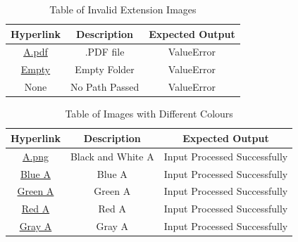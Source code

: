 \documentclass[12pt, titlepage]{article}
\begin{document}
\begin{table}[h!]
  \centering
  \begin{tabular}{|c|c|c|}
    \hline
    \textbf{Hyperlink} & \textbf{Description} & \textbf{Expected Output} \\ \hline
    \href{https://github.com/cer-hunter/OAR-CAS741/tree/main/tests/test-images/A.pdf}{A.pdf} & .PDF file & ValueError \\ \hline
    \href{https://github.com/cer-hunter/OAR-CAS741/tree/main/tests/test-images/Empty}{Empty} & Empty Folder & ValueError \\ \hline
    None & No Path Passed & ValueError \\ \hline
  \end{tabular}
  \caption{Table of Invalid Extension Images}
  \label{table_exterr}
\end{table}

\begin{table}[h!]
  \centering
  \begin{tabular}{|c|c|c|}
    \hline
    \textbf{Hyperlink} & \textbf{Description} & \textbf{Expected Output} \\ \hline
    \href{https://github.com/cer-hunter/OAR-CAS741/tree/main/tests/test-images/A.png}{A.png} & Black and White A & Input Processed Successfully \\ \hline
    \href{https://github.com/cer-hunter/OAR-CAS741/tree/main/tests/test-images/A_Blue.png}{Blue A} & Blue A & Input Processed Successfully \\ \hline
    \href{https://github.com/cer-hunter/OAR-CAS741/tree/main/tests/test-images/A_Green.png}{Green A} & Green A & Input Processed Successfully \\ \hline
    \href{https://github.com/cer-hunter/OAR-CAS741/tree/main/tests/test-images/A_Red.png}{Red A} & Red A & Input Processed Successfully \\ \hline
    \href{https://github.com/cer-hunter/OAR-CAS741/tree/main/tests/test-images/A_Gray.png}{Gray A} & Gray A & Input Processed Successfully \\ \hline
  \end{tabular}
  \caption{Table of Images with Different Colours}
  \label{table_colour}
\end{table}
\end{document}
